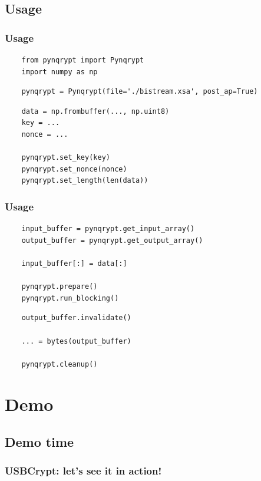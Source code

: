\documentclass{beamer}
\begin{document}
\subsection{Usage}
\begin{frame}[fragile]
    \frametitle{Usage}

    \begin{lstlisting}
    from pynqrypt import Pynqrypt
    import numpy as np
    \end{lstlisting}

    \begin{lstlisting}
    pynqrypt = Pynqrypt(file='./bistream.xsa', post_ap=True)
    \end{lstlisting}

    \begin{lstlisting}
    data = np.frombuffer(..., np.uint8)
    key = ...
    nonce = ...

    pynqrypt.set_key(key)
    pynqrypt.set_nonce(nonce)
    pynqrypt.set_length(len(data))
    \end{lstlisting}
\end{frame}

\begin{frame}[fragile]
    \frametitle{Usage}

    \begin{lstlisting}
    input_buffer = pynqrypt.get_input_array()
    output_buffer = pynqrypt.get_output_array()

    input_buffer[:] = data[:]

    pynqrypt.prepare()
    pynqrypt.run_blocking()
    \end{lstlisting}

    \begin{lstlisting}
    output_buffer.invalidate()

    ... = bytes(output_buffer)

    pynqrypt.cleanup()
    \end{lstlisting}
\end{frame}

\section{Demo}

\subsection{Demo time}
\begin{frame}
    \frametitle{USBCrypt: let's see it in action!}
\end{frame}
\end{document}
